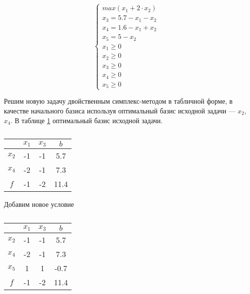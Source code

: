 \begin{enumerate}
\begin{equation}
\label{eq:simpl:double:canonic}
\begin{cases}
	max \left( x_1 + 2 \cdot x_2 \right)
	\\
	x_3 = 5.7 - x_1 - x_2
	\\
	x_4 = 1.6 - x_1 + x_2
	\\
	x_5 = 5 - x_2
	\\
	x_1 \geq 0
	\\
	x_2 \geq 0
	\\
	x_3 \geq 0	
	\\
	x_4 \geq 0
	\\
	x_5 \geq 0
\end{cases}
\end{equation}	

Решим новую задачу двойственным симплекс-методом в табличной форме, в качестве начального базиса используя оптимальный базис исходной задачи --- $x_2$, $x_4$. В таблице \ref{tab:simplex:double:1} оптимальный базис исходной задачи.

\begin{table}[H]
\begin{center}
	\caption{}
	\label{tab:simplex:double:1}
	\def\tabcolsep{18pt}
	\def\arraystretch{1.5}
	\fontsize{13}{14}\selectfont
	\begin{tabular}{|c|c|c|c|}
	\hline
	 & $x_1$ & $x_3$ & $b$ \\ 
	\hline 
	$x_2$ & -1 & -1 & 5.7 \\ 
	\hline
	$x_4$ & -2 & -1 & 7.3 \\ 
	\hline 
	$f$ & -1 & -2 & 11.4 \\ 
	\hline 
	\end{tabular} 
\end{center}
\end{table}

Добавим новое условие

\begin{table}[H]
\begin{center}
	\caption{}
	\label{tab:simplex:double:2}
	\def\tabcolsep{18pt}
	\def\arraystretch{1.5}
	\fontsize{13}{14}\selectfont
	\begin{tabular}{|c||c||c|c|}
	\hline
	 & $x_1$ & $x_3$ & $b$ \\ 
	\hline 
	$x_2$ & -1 & -1 & 5.7 \\ 
	\hline
	$x_4$ & -2 & -1 & 7.3 \\ 
	\hhline{|=|=|=|=|}
	$x_5$ & \cellcolor{pink} 1 & 1 & -0.7 \\
	\hhline{|=|=|=|=|}
	$f$ & -1 & -2 & 11.4 \\ 
	\hline 
	\end{tabular} 
\end{center}
\end{table}


\end{enumerate}
